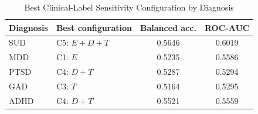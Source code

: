 \begin{table}[!t]
\caption{Best Clinical-Label Sensitivity Configuration by Diagnosis}
\label{tab:clinical_best}
\centering
\footnotesize
\begin{tabular}{llcc}
\hline
Diagnosis & Best configuration & Balanced acc. & ROC-AUC \\
\hline
SUD & C5: $E+D+T$ & 0.5646 & 0.6019 \\
MDD & C1: $E$ & 0.5235 & 0.5586 \\
PTSD & C4: $D+T$ & 0.5287 & 0.5294 \\
GAD & C3: $T$ & 0.5164 & 0.5295 \\
ADHD & C4: $D+T$ & 0.5521 & 0.5559 \\
\hline
\end{tabular}
\end{table}
